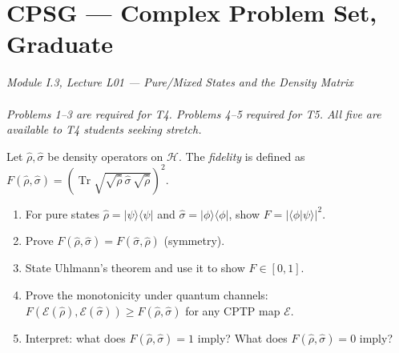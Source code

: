 \documentclass[11pt,a4paper]{article}
\begin{document}
\section*{CPSG --- Complex Problem Set, Graduate}
\begin{center}
  \textit{Module I.3, Lecture L01 --- Pure/Mixed States and the Density Matrix}\\[4pt]
  \quad{}\\[6pt]
  \textit{Problems 1--3 are required for T4. Problems 4--5 required for T5.
  All five are available to T4 students seeking stretch.}
\end{center}

\bigskip

\begin{tcolorbox}[gradprobbox, title={Problem 1 --- Uhlmann Fidelity and Purification (T4)}]
Let $\hat{\rho},\hat{\sigma}$ be density operators on $\mathcal{H}$.
The \emph{fidelity} is defined as
$F(\hat{\rho},\hat{\sigma})=\left(\operatorname{Tr}\sqrt{\sqrt{\hat{\rho}}\,\hat{\sigma}\,\sqrt{\hat{\rho}}}\right)^2$.

\begin{enumerate}[label=(\alph*), itemsep=8pt]
  \item For pure states $\hat{\rho}=|\psi\rangle\langle\psi|$ and
        $\hat{\sigma}=|\phi\rangle\langle\phi|$, show $F=|\langle\phi|\psi\rangle|^2$.
  \item Prove $F(\hat{\rho},\hat{\sigma})=F(\hat{\sigma},\hat{\rho})$ (symmetry).
  \item State Uhlmann's theorem and use it to show $F\in[0,1]$.
  \item Prove the monotonicity under quantum channels:
        $F(\mathcal{E}(\hat{\rho}),\mathcal{E}(\hat{\sigma}))\ge F(\hat{\rho},\hat{\sigma})$
        for any CPTP map $\mathcal{E}$.
  \item Interpret: what does $F(\hat{\rho},\hat{\sigma})=1$ imply? What does
        $F(\hat{\rho},\hat{\sigma})=0$ imply?
\end{enumerate}
\end{tcolorbox}

\bigskip
\end{document}

